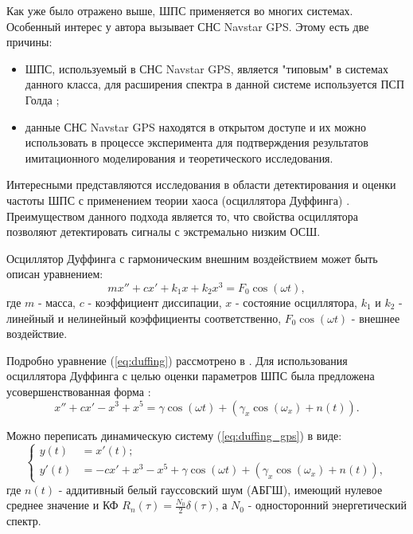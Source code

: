 Как уже было отражено выше, ШПС применяется во многих системах. Особенный интерес у автора вызывает СНС Navstar GPS. Этому есть две причины:
\begin{itemize}
	\item ШПС, используемый в СНС Navstar GPS, является "типовым" в системах данного класса, для расширения спектра в данной системе используется ПСП Голда \cite{gold-ieee};
	\item данные СНС Navstar GPS находятся в открытом доступе и их можно использовать в процессе эксперимента для подтверждения результатов имитационного
		моделирования и теоретического исследования.
\end{itemize}

Интересными представляются исследования в области детектирования и оценки
частоты ШПС с применением теории хаоса (осциллятора Дуффинга) \cite{chaos_cambridge, chaos_huang, chaos_wang}. Преимуществом
данного подхода является то, что свойства осциллятора позволяют детектировать сигналы с экстремально низким ОСШ.

Осциллятор Дуффинга \cite{kobilkina_phd, sidorkina_phd} с гармоническим внешним воздействием может быть описан уравнением:
\begin{equation}
	\label{eq:duffing}
	mx'' + cx' + k_{1}x + k_{2}x^3 = F_{0}\cos(\omega{t}),
\end{equation}
где $m$ - масса, $c$ - коэффициент диссипации, $x$ - состояние осциллятора, $k_1$ и $k_2$ - линейный и нелинейный коэффициенты соответственно,
$F_{0}\cos(\omega{t})$ - внешнее воздействие.

Подробно уравнение (\ref{eq:duffing}) рассмотрено в \cite{chaos_neimark_landa}.
Для использования осциллятора Дуффинга с целью оценки параметров ШПС была предложена усовершенствованная форма \cite{chaos_song, chaos_huang}:
\begin{equation}
	\label{eq:duffing_gps}
	x'' +cx' - x^3 + x^5 = \gamma\cos(\omega{t}) + (\gamma_{x}\cos(\omega_{x}) + n(t)).
\end{equation}

Можно переписать динамическую систему (\ref{eq:duffing_gps}) в виде:
\begin{equation}
	\label{eq:duffing_gps_2}
	\left\{
	\begin{aligned}
		y(t) & = x'(t); \\
		y'(t) & =  -cx' + x^3 - x^5 + \gamma\cos(\omega{t}) + (\gamma_{x}\cos(\omega_{x}) + n(t)),
	\end{aligned}
	\right.
\end{equation}
где ${n(t)}$ - аддитивный белый гауссовский шум (АБГШ), имеющий нулевое среднее  значение и КФ ${R_n(\tau) = \frac{N_0}{2} \delta(\tau)}$,
а ${N_0}$ - односторонний энергетический спектр.

